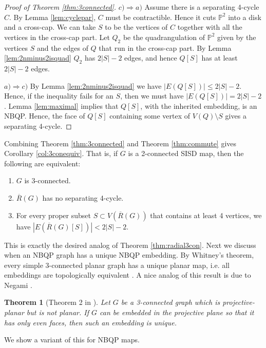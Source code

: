 \documentclass{article}
\newtheorem{theorem}{Theorem}[section]
\newcommand{\Pb}[0]{\mathbb{P}}
\begin{document}
\begin{proof}[Proof of Theorem \ref{thm:3connected}]
    $c)\Rightarrow a)$ Assume there is a separating 4-cycle $C$. By Lemma \ref{lem:cyclepar}, $C$ must be contractible. Hence it cuts $\Pb^2$ into a disk and a cross-cap. We can take $S$ to be the vertices of $C$ together with all the vertices in the cross-cap part. Let $Q_2$ be the quadrangulation of $\Pb^2$ given by the vertices $S$ and the edges of $Q$ that run in the cross-cap part. By Lemma \ref{lem:2nminus2isquad}  $Q_2$  has $2|S|-2$ edges, and hence $Q[S]$ has at least $2|S|-2$ edges.

    $a)\Rightarrow c)$  By Lemma \ref{lem:2nminus2isquad} we have $|E(Q[S])|\le 2|S|-2$. Hence, if the inequality fails for an $S$, then we must have $|E(Q[S])|= 2|S|-2$. Lemma \ref{lem:maximal} implies that $Q[S]$, with the inherited embedding, is an NBQP. Hence, the face of $Q[S]$ containing some vertex of $V(Q)\setminus S$ gives a separating 4-cycle. 
    
\end{proof}



Combining Theorem \ref{thm:3connected} and Theorem \ref{thm:commute} gives Corollary \ref{col:3conequiv}. That is, if $G$ is a 2-connected SISD map, then the following are equivalent:
    \begin{enumerate}
        \item $G$ is 3-connected.
        \item $\overline R(G)$ has no separating 4-cycle.
        \item For every proper subset $S\subset V(\overline R(G))$ that contains at least 4 vertices, we have $|E(\overline R(G)[S])|< 2|S|-2$.
    \end{enumerate}

This is exactly the desired analog of Theorem \ref{thm:radial3con}. Next we discuss when an NBQP graph has a unique NBQP embedding. By Whitney's theorem, every simple 3-connected planar graph has a unique planar map, i.e. all embeddings are topologically equivalent \cite{whitney19332}. A nice analog of this result is due to Negami \cite{NE92}.

\begin{theorem}[Theorem 2 in \cite{NE92}]
Let $G$ be a 3-connected graph which is projective-planar but is not planar. If $G$ can be embedded in the projective plane so that it has only even faces, then such an embedding is unique. 
\end{theorem}

We show a variant of this for NBQP maps. 
\end{document}
